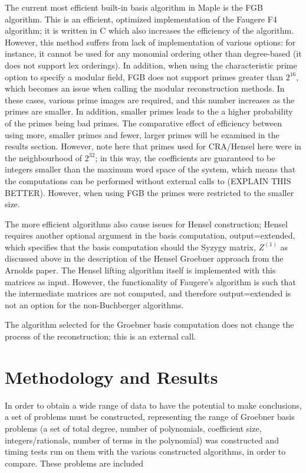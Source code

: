 \documentclass[letterpaper,12pt,titlepage,oneside,final]{book}
\begin{document}
The current most efficient built-in basis algorithm in Maple is the FGB algorithm.  This is an efficient, optimized implementation of the Faugere F4 algorithm; it is written in C which also increases the efficiency of the algorithm.  However, this method suffers from lack of implementation of various options: for instance, it cannot be used for any monomial ordering other than degree-based (it does not support lex orderings).  In addition, when using the characteristic prime option to specify a modular field, FGB does not support primes greater than ${2^{16}}$, which becomes an issue when calling the modular reconstruction methods.  In these cases, various prime images are required, and this number increases as the primes are smaller.  In addition, smaller primes leads to the a higher probability of the primes being bad primes.  The comparative effect of efficiency between using more, smaller primes and fewer, larger primes will be examined in the results section.  However, note here that primes used for CRA/Hensel here were in the neighbourhood of ${2^{32}}$; in this way, the coefficients are guaranteed to be integers smaller than the maximum word space of the system, which means that the computations can be performed without external calls to (EXPLAIN THIS BETTER).  However, when using FGB the primes were restricted to the smaller size.

The more efficient algorithms also cause issues for Hensel construction; Hensel requires another optional argument in the basis computation, output=extended, which specifies that the basis computation should the Syzygy matrix, ${Z^{(1)}}$ as discussed above in the description of the Hensel Groebner approach from the Arnolds paper.  The Hensel lifting algorithm itself is implemented with this matrices as input.  However, the functionality of Faugere's algorithm is such that the intermediate matrices are not computed, and therefore output=extended is not an option for the non-Buchberger algorithms.  

The algorithm selected for the Groebner basis computation does not change the process of the reconstruction; this is an external call.

\chapter{Methodology and Results}

In order to obtain a wide range of data to have the potential to make conclusions, a set of problems must be constructed, representing the range of Groebner basis problems (a set of total degree, number of polynomials, coefficient size, integers/rationals, number of terms in the polynomial) was constructed and timing tests run on them with the various constructed algorithms, in order to compare.  These problems are included 
\end{document}
